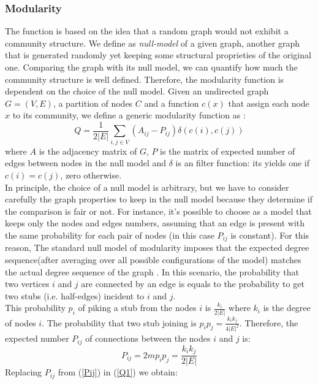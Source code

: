 \subsubsection{Modularity}
The function is based on the idea that a random graph would not exhibit a community structure.
We define as \textit{null-model} of a given graph, another graph that is generated randomly yet keeping some structural proprieties of the original one.
Comparing the graph with its null model, we can quantify how much the community structure is well defined. Therefore, the modularity function is dependent on the choice of the null model. 
Given an undirected graph $G = (V,E)$, a partition of nodes $C$ and a function $c(x)$ that assign each node $x$ to its community, we define a generic modularity function as :
\begin{equation}\label{Q1}
Q = \frac{1}{2|E|} \sum_{i,j \in V}(A_{ij} - P_{ij}) \delta(c(i), c(j))
\end{equation}
where $A$ is the  adjacency matrix of $G$, $P$ is the matrix of expected number of edges between nodes in the null model and $\delta$ is an filter function: its yields one if $c(i) = c(j)$, zero otherwise.\\
In principle, the choice of a null model is arbitrary, but we have to consider carefully the graph properties to keep in the null model because they determine if the comparison is fair or not. 
For instance, it's possible to choose as a model that keeps only the nodes and edges numbers, assuming that an edge is present with the same probability for each pair of nodes (in this case $P_{ij}$ is constant). 
For this reason, The standard null model of modularity imposes that the expected degree sequence(after averaging over all possible configurations of the model) matches the actual degree sequence of the graph \cite{fortunato}.
In this scenario, the probability that two vertices $i$ and $j$ are connected by an edge is equals to the probability to get two stubs (i.e. half-edges) incident to $i$ and $j$.\\
This probability $p_i$ of piking a stub from the nodes $i$ is $\frac{k_i}{2|E|}$ where $k_i$ is the degree of nodes $i$. The probability that two stub joining is $p_ip_j = \frac{k_ik_j}{4|E|^2}$. Therefore, the expected number $P_{ij}$ of connections between the nodes $i$ and $j$ is:
\begin{equation}\label{Pij}
P_{ij} = 2mp_ip_j = \frac{k_ik_j}{2|E|}
\end{equation}
Replacing $P_{ij}$ from (\ref{Pij}) in (\ref{Q1}) we obtain:
